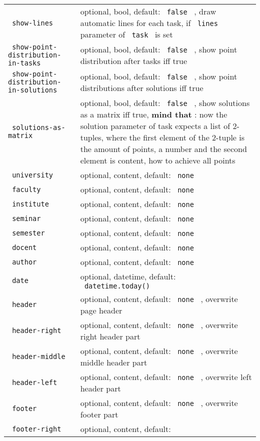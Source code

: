 \begin{longtable}[]{@{}ll@{}}
\texttt{\ show-lines\ } & optional, bool, default: \texttt{\ false\ } ,
draw automatic lines for each task, if \texttt{\ lines\ } parameter of
\texttt{\ task\ } is set \\
\texttt{\ show-point-distribution-in-tasks\ } & optional, bool, default:
\texttt{\ false\ } , show point distribution after tasks iff true \\
\texttt{\ show-point-distribution-in-solutions\ } & optional, bool,
default: \texttt{\ false\ } , show point distributions after solutions
iff true \\
\texttt{\ solutions-as-matrix\ } & optional, bool, default:
\texttt{\ false\ } , show solutions as a matrix iff true, \textbf{mind
that} : now the solution parameter of task expects a list of 2-tuples,
where the first element of the 2-tuple is the amount of points, a number
and the second element is content, how to achieve all points \\
\texttt{\ university\ } & optional, content, default:
\texttt{\ none\ } \\
\texttt{\ faculty\ } & optional, content, default: \texttt{\ none\ } \\
\texttt{\ institute\ } & optional, content, default:
\texttt{\ none\ } \\
\texttt{\ seminar\ } & optional, content, default: \texttt{\ none\ } \\
\texttt{\ semester\ } & optional, content, default: \texttt{\ none\ } \\
\texttt{\ docent\ } & optional, content, default: \texttt{\ none\ } \\
\texttt{\ author\ } & optional, content, default: \texttt{\ none\ } \\
\texttt{\ date\ } & optional, datetime, default:
\texttt{\ datetime.today()\ } \\
\texttt{\ header\ } & optional, content, default: \texttt{\ none\ } ,
overwrite page header \\
\texttt{\ header-right\ } & optional, content, default:
\texttt{\ none\ } , overwrite right header part \\
\texttt{\ header-middle\ } & optional, content, default:
\texttt{\ none\ } , overwrite middle header part \\
\texttt{\ header-left\ } & optional, content, default: \texttt{\ none\ }
, overwrite left header part \\
\texttt{\ footer\ } & optional, content, default: \texttt{\ none\ } ,
overwrite footer part \\
\texttt{\ footer-right\ } & optional, content, default:

\end{longtable}
